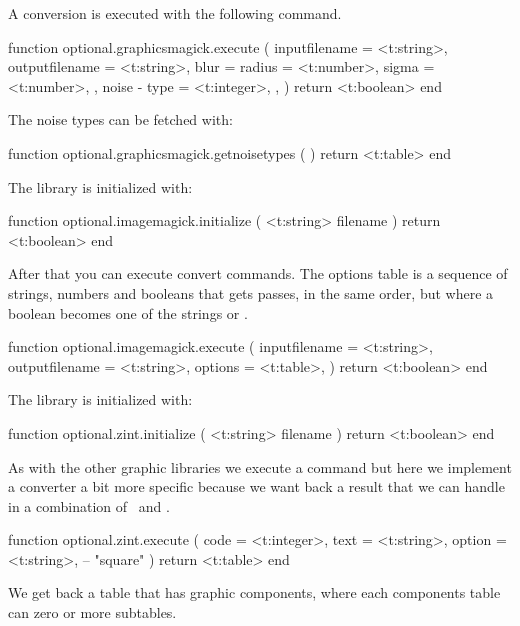 A conversion is executed with the following command.

\starttyping[option=LUA]
function optional.graphicsmagick.execute (
    {
        inputfilename  = <t:string>,
        outputfilename = <t:string>,
        blur           = {
            radius = <t:number>,
            sigma  = <t:number>,
        },
        noise          - {
            type   = <t:integer>,
        },
    }
)
    return <t:boolean>
end
\stoptyping

The noise types can be fetched with:

\starttyping[option=LUA]
function optional.graphicsmagick.getnoisetypes ( )
    return <t:table>
end
\stoptyping

\stopsubsubsubject

\startsubsubsubject[title=imagemagick]

The  library is initialized with:

\starttyping[option=LUA]
function optional.imagemagick.initialize ( <t:string> filename )
    return <t:boolean>
end
\stoptyping

After that you can execute convert commands. The options table is a sequence of
strings, numbers and booleans that gets passes, in the same order, but where a
boolean becomes one of the strings  or .

\starttyping[option=LUA]
function optional.imagemagick.execute (
    {
        inputfilename  = <t:string>,
        outputfilename = <t:string>,
        options        = <t:table>,
    }
)
    return <t:boolean>
end
\stoptyping

\stopsubsubsubject

\startsubsubsubject[title=zint]

The  library is initialized with:

\starttyping[option=LUA]
function optional.zint.initialize ( <t:string> filename )
    return <t:boolean>
end
\stoptyping

As with the other graphic libraries we execute a command but here we implement a
converter a bit more specific because we want back a result that we can handle in
a combination of \TEX\ and \METAPOST.

\starttyping[option=LUA]
function optional.zint.execute (
    {
        code   = <t:integer>,
        text   = <t:string>,
        option = <t:string>, -- "square"
    }
)
    return <t:table>
end
\stoptyping

We get back a table that has graphic components, where each components table can
zero or more subtables.

